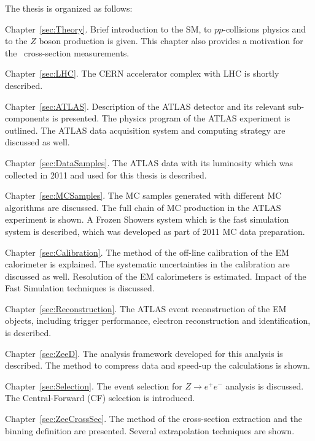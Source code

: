 The thesis is organized as follows:
\begin{description}
\item Chapter~\ref{sec:Theory}. Brief introduction to the SM, to $pp$-collisions physics and to the $Z$ boson production is given. This chapter also provides a motivation for the \Zee\ cross-section measurements.

\item Chapter~\ref{sec:LHC}. The CERN accelerator complex with LHC is shortly described.

\item Chapter~\ref{sec:ATLAS}. Description of the ATLAS detector and its relevant sub-components is presented. The physics program of the ATLAS experiment is outlined. The ATLAS data acquisition system and computing strategy are discussed as well.

\item Chapter~\ref{sec:DataSamples}. The ATLAS data with its luminosity which was collected in 2011 and used for this thesis is described.

\item Chapter~\ref{sec:MCSamples}. The MC samples generated with different MC algorithms are discussed. The full chain of MC production in the ATLAS experiment is shown. A Frozen Showers system which is the fast simulation system is described, which was developed as part of 2011 MC data preparation.

\item Chapter~\ref{sec:Calibration}. The method of the off-line calibration of the EM calorimeter is explained. The systematic uncertainties in the calibration are discussed as well. Resolution of the EM calorimeters is estimated. Impact of the Fast Simulation techniques is discussed.

\item Chapter~\ref{sec:Reconstruction}. The ATLAS event reconstruction of the EM objects, including trigger performance, electron reconstruction and identification, is described.

\item Chapter~\ref{sec:ZeeD}. The analysis framework developed for this analysis is described. The method to compress data and speed-up the calculations is shown.

\item Chapter~\ref{sec:Selection}. The event selection for $Z \to e^+e^-$ analysis is discussed. The Central-Forward (CF) selection is introduced.

\item Chapter~\ref{sec:ZeeCrossSec}. The method of the cross-section extraction and the binning definition are presented. Several extrapolation techniques are shown.


\end{description}
